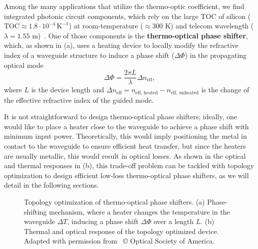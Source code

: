 Among the many applications that utilize the thermo-optic coefficient, we find integrated photonic circuit components, which rely on the large 
TOC of silicon ($\text{TOC} \approx 1.8 \cdot 10^{-4}\, \text{K}^{-1}$) at room-temperature ($\approx300$ K) and telecom wavelength 
($\lambda=1.55$ \textmu m)~\cite{thermo-optic-coef}. One of those components is the \textbf{thermo-optical phase shifter}, which, as shown in  (a),
uses a heating device to locally modify the refractive index of a waveguide structure to induce a phase shift ($\Delta \Phi$) in the propagating optical mode
\begin{equation}\label{eq:phase_shift}
\Delta \Phi = \frac{2\pi L}{\lambda} \Delta n_\text{eff},
\end{equation}
where $L$ is the device length and $\Delta n_\text{eff} = n_\text{eff, heated} - n_\text{eff, unheated}$
 is the change of the effective refractive index of the guided mode. 
 
 It is not straightforward to design thermo-optical phase shifters; ideally, one would like to place a heater close to the waveguide to achieve a phase shift with minimum input power.
 Theoretically, this would imply positioning the metal in contact to the waveguide to ensure efficient heat transfer, but since the heaters are usually metallic, this would result
 in optical losses. As shown in the optical and thermal responses in  (b), this trade-off problem can be tackled with topology optimization to design efficient low-loss thermo-optical phase shifters, 
 as we will detail in the following sections.

\begin{figure}[tb]
    \centering
    \caption{Topology optimization of thermo-optical phase shifters. (a) Phase-shifting mechanism, where a heater changes the temperature in the waveguide $\Delta T$, inducing a phase shift
    $\Delta \Phi$ over a length $L$. (b) Thermal and optical response of the topology optimized device. Adapted with permission from~\cite{ownpub0} © Optical Society of America.}
    \label{fig:thermo_res}
\end{figure}


